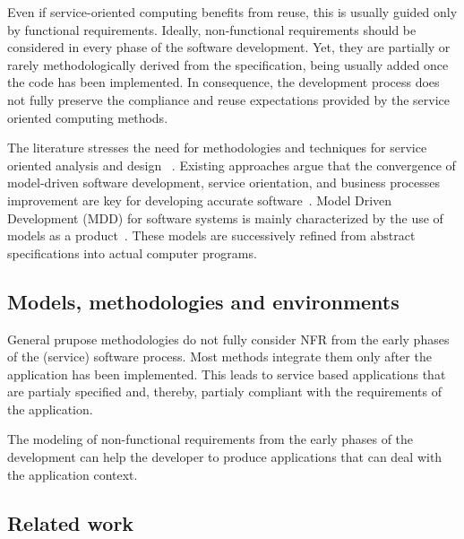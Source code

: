 Even if service-oriented computing benefits from reuse, this  is usually guided only by functional requirements. 
Ideally, non-functional requirements should be considered in every phase of the software development.
Yet,  they are partially or rarely methodologically derived from the specification, being usually added once the code has been implemented. 
In consequence, the development process does not fully preserve the compliance and reuse expectations provided by the service oriented computing methods.


The literature stresses the need for methodologies and techniques for service oriented analysis and design 
~\cite{Papazoglou2007}. 
Existing approaches argue that the convergence of model-driven software development, service orientation,   and  business processes improvement are key for developing accurate  software~\cite{watson}. 
Model Driven Development (MDD)  for software systems is mainly characterized by the use of models as a product~\cite{Selic03}.
These models are successively refined from abstract specifications into actual computer programs.


\subsection{Models, methodologies and environments}

General prupose methodologies do not fully consider NFR from the early phases of the (service) software process. 
 Most methods integrate them only after the application has been implemented. This leads to service based applications that are partialy specified and, thereby, partialy compliant with the requirements of the application.


The modeling of non-functional requirements from the early phases of the development can help the developer to produce applications that  can deal with the application context.


\subsection{Related work}

